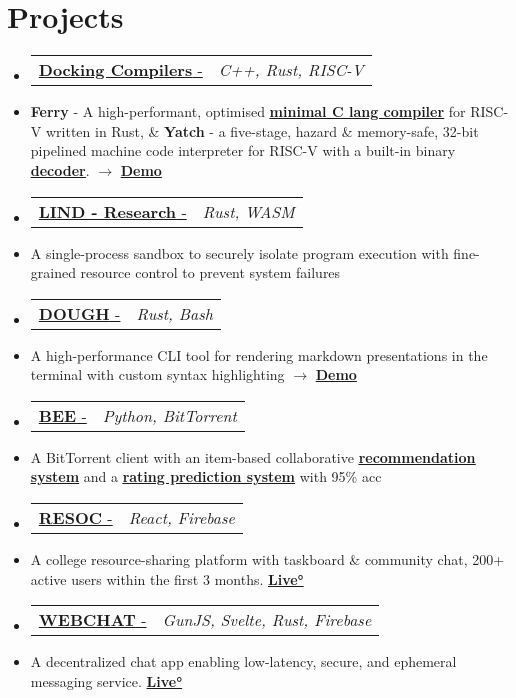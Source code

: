 \documentclass[letterpaper,10pt]{article}
\makeatletter
\newcommand{\resumeItem}[1]{
  \item\small{
    {#1 \vspace{-2pt}}
  }
}
\newcommand{\resumeProjectHeading}[2]{
    \item
    \begin{tabular*}{0.97\textwidth}{l@{\extracolsep{\fill}}r}
      \small#1 & \textit{\small #2} \\
    \end{tabular*}\vspace{-4 pt}
}
\newcommand{\resumeSubItem}[1]{\resumeItem{#1}\vspace{-4pt}}
\newcommand{\resumeSubHeadingListStart}{\begin{itemize}[leftmargin=0.15in, label={}]}
\newcommand{\resumeSubHeadingListEnd}{\end{itemize}}
\makeatother
\begin{document}
\section{Projects}
  \resumeSubHeadingListStart
  \resumeProjectHeading
  {\href{https://anubhavp.dev/blog/hacktoberfest}{\textbf{Docking Compilers} - \faIcon{link}}}{C++, Rust, RISC-V}
    \resumeSubItem
      {\textbf{Ferry} - A high-performant, optimised {\href{https://anubhavp.dev/blog/ferryman.html} {\underline{\textbf{minimal C lang compiler}}}} for RISC-V written in Rust, \& \textbf{Yatch} - a five-stage, hazard \& memory-safe, 32-bit pipelined machine code interpreter for RISC-V with a built-in binary {\href{https://anubhavp.dev/barney}{\underline{\textbf{decoder}}}}. $\rightarrow$ {\href{https://anubhavp.dev/blog/hacktoberfest.html}{\textbf{Demo}}}}
  \resumeProjectHeading
    {\href{https://github.com/Lind-Project/lind_project}{\textbf{LIND - Research} \text{/ Open Source Contribution} - \faIcon{link}}}{Rust, WASM}
    \resumeSubItem
      {A single-process sandbox to securely isolate program execution with fine-grained resource control to prevent system failures}
  \resumeProjectHeading
    {\href{https://github.com/anubhavpgit/dough}{\textbf{DOUGH} - \faIcon{link}}}{Rust, Bash}
    \resumeSubItem
      {A high-performance CLI tool for rendering markdown presentations in the terminal with custom syntax highlighting $\rightarrow$ {\href{https://anubhavp.dev/blog/dough.html}{\textbf{Demo}}}}
  \resumeProjectHeading
    {\href{https://github.com/anubhavpgit/b}{{\textbf{BEE} - \faIcon{link} }}}{Python, BitTorrent}
    \resumeSubItem
      {A BitTorrent client with an item-based collaborative \href{https://github.com/anubhavpgit/Movie-recommendation}{\underline{\textbf{recommendation system}}} and a \href{https://github.com/anubhavpgit/Movie-rating-prediction}{\underline{\textbf{rating prediction system}}} with 95\% acc}
  \resumeProjectHeading
    {\href{https://github.com/anubhavpgit/resoc}{\textbf{RESOC} - \faIcon{link} }}{React, Firebase}
    \resumeSubItem
      {A college resource-sharing platform with taskboard \& community chat, 200+ active users within the first 3 months. {\href{https://resoc.in}{\textbf{Live°}}}}
    \resumeProjectHeading
    {\href{https://github.com/anubhavpgit/w3bchat-dapp}{\textbf{WEBCHAT} - \faIcon{link}}}{GunJS, Svelte, Rust, Firebase}
    \resumeSubItem
      {A decentralized chat app enabling low-latency, secure, and ephemeral messaging service. {\href{https://w3bchat-fadfa.web.app/}{\textbf{Live°}}}}
  \resumeSubHeadingListEnd
\end{document}
